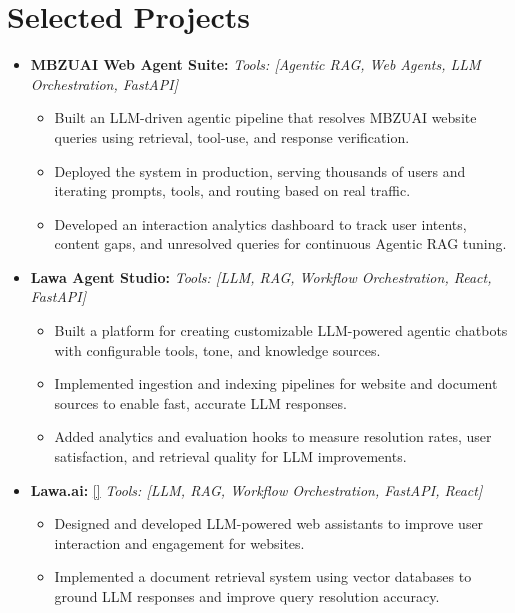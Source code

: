 \documentclass[11pt,a4paper]{article}
\begin{document}
\section*{Selected Projects}
\begin{itemize}
  \par{}
  \item \textbf{MBZUAI Web Agent Suite:}
  \textit{Tools: [Agentic RAG, Web Agents, LLM Orchestration, FastAPI]}
  \begin{itemize}
    \item Built an LLM-driven agentic pipeline that resolves MBZUAI website queries using retrieval, tool-use, and response verification.
    \item Deployed the system in production, serving thousands of users and iterating prompts, tools, and routing based on real traffic.
    \item Developed an interaction analytics dashboard to track user intents, content gaps, and unresolved queries for continuous Agentic RAG tuning.
  \end{itemize}
  \par{}
  \item \textbf{Lawa Agent Studio:}
  \textit{Tools: [LLM, RAG, Workflow Orchestration, React, FastAPI]}
  \begin{itemize}
    \item Built a platform for creating customizable LLM-powered agentic chatbots with configurable tools, tone, and knowledge sources.
    \item Implemented ingestion and indexing pipelines for website and document sources to enable fast, accurate LLM responses.
    \item Added analytics and evaluation hooks to measure resolution rates, user satisfaction, and retrieval quality for LLM improvements.
  \end{itemize}
  \par{}
  \item \textbf{Lawa.ai:} \href{https://lawa.ai}{[\faGlobe]}
  \textit{Tools: [LLM, RAG, Workflow Orchestration, FastAPI, React]}
  \begin{itemize}
    \item Designed and developed LLM-powered web assistants to improve user interaction and engagement for websites.
    \item Implemented a document retrieval system using vector databases to ground LLM responses and improve query resolution accuracy.

\end{itemize}
\end{itemize}
\end{document}
